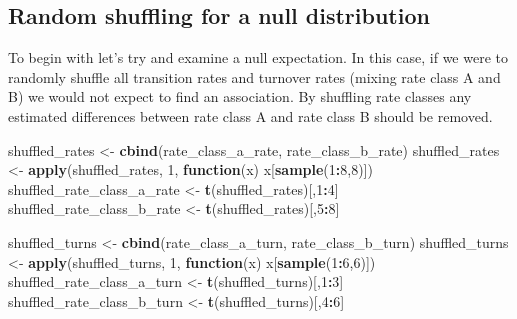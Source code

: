 \documentclass[
]{article}
\newenvironment{Shaded}{\begin{snugshade}}{\end{snugshade}}
\newcommand{\ControlFlowTok}[1]{\textcolor[rgb]{0.13,0.29,0.53}{\textbf{#1}}}
\newcommand{\DecValTok}[1]{\textcolor[rgb]{0.00,0.00,0.81}{#1}}
\newcommand{\FunctionTok}[1]{\textcolor[rgb]{0.13,0.29,0.53}{\textbf{#1}}}
\newcommand{\NormalTok}[1]{#1}
\newcommand{\OtherTok}[1]{\textcolor[rgb]{0.56,0.35,0.01}{#1}}
\newcommand{\SpecialCharTok}[1]{\textcolor[rgb]{0.81,0.36,0.00}{\textbf{#1}}}
\begin{document}
\hypertarget{random-shuffling-for-a-null-distribution}{%
\subsection{Random shuffling for a null
distribution}\label{random-shuffling-for-a-null-distribution}}

To begin with let's try and examine a null expectation. In this case, if
we were to randomly shuffle all transition rates and turnover rates
(mixing rate class A and B) we would not expect to find an association.
By shuffling rate classes any estimated differences between rate class A
and rate class B should be removed.

\begin{Shaded}
\begin{Highlighting}[]
\NormalTok{shuffled\_rates }\OtherTok{\textless{}{-}} \FunctionTok{cbind}\NormalTok{(rate\_class\_a\_rate, rate\_class\_b\_rate)}
\NormalTok{shuffled\_rates }\OtherTok{\textless{}{-}} \FunctionTok{apply}\NormalTok{(shuffled\_rates, }\DecValTok{1}\NormalTok{, }
                        \ControlFlowTok{function}\NormalTok{(x) x[}\FunctionTok{sample}\NormalTok{(}\DecValTok{1}\SpecialCharTok{:}\DecValTok{8}\NormalTok{,}\DecValTok{8}\NormalTok{)])}
\NormalTok{shuffled\_rate\_class\_a\_rate }\OtherTok{\textless{}{-}} \FunctionTok{t}\NormalTok{(shuffled\_rates)[,}\DecValTok{1}\SpecialCharTok{:}\DecValTok{4}\NormalTok{]}
\NormalTok{shuffled\_rate\_class\_b\_rate }\OtherTok{\textless{}{-}} \FunctionTok{t}\NormalTok{(shuffled\_rates)[,}\DecValTok{5}\SpecialCharTok{:}\DecValTok{8}\NormalTok{]}


\NormalTok{shuffled\_turns }\OtherTok{\textless{}{-}} \FunctionTok{cbind}\NormalTok{(rate\_class\_a\_turn, rate\_class\_b\_turn)}
\NormalTok{shuffled\_turns }\OtherTok{\textless{}{-}} \FunctionTok{apply}\NormalTok{(shuffled\_turns, }\DecValTok{1}\NormalTok{, }
                        \ControlFlowTok{function}\NormalTok{(x) x[}\FunctionTok{sample}\NormalTok{(}\DecValTok{1}\SpecialCharTok{:}\DecValTok{6}\NormalTok{,}\DecValTok{6}\NormalTok{)])}
\NormalTok{shuffled\_rate\_class\_a\_turn }\OtherTok{\textless{}{-}} \FunctionTok{t}\NormalTok{(shuffled\_turns)[,}\DecValTok{1}\SpecialCharTok{:}\DecValTok{3}\NormalTok{]}
\NormalTok{shuffled\_rate\_class\_b\_turn }\OtherTok{\textless{}{-}} \FunctionTok{t}\NormalTok{(shuffled\_turns)[,}\DecValTok{4}\SpecialCharTok{:}\DecValTok{6}\NormalTok{]}


\end{Highlighting}
\end{Shaded}
\end{document}
